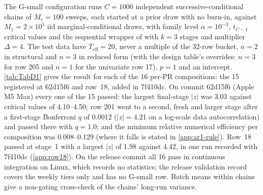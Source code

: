 The G-small configuration runs $C = 1000$ independent successive-conditional chains of $M_c = 100$
sweeps, each started at a prior draw with no burn-in, against $M_1 = 2\times10^5$ iid
marginal-conditional draws, with family level $\alpha = 10^{-3}$, $t_{C-1}$ critical values and the
sequential wrapper of \citet{gandy2021unit} with $k = 3$ stages and multiplier $\Delta = 4$.
The test data have $T_{\mathrm{eff}} = 20$, never a multiple of the 32-row bucket, $n = 2$ in
structural and $n = 3$ in reduced form (with the design table's overrides: $n = 3$ for row 205 and
$n = 1$ for the univariate row 17), $p = 1$ and an intercept.
\cref{tab:TabD1} gives the result for each of the 16 per-PR compositions: the 15 registered at
62d15f6 and row~18, added in 7f410dc.
On commit 62d15f6 (Apple M5 Max) every one of the 15 passed: the largest final-stage $|z|$ was 3.03
against critical values of 4.10--4.50; row 201 went to a second, fresh and larger stage after a
first-stage Bonferroni $q$ of 0.0012 ($|z| = 4.21$ on a log-scale data autocorrelation) and passed
there with $q = 1.0$; and the minimum relative numerical efficiency per composition was 0.008--0.129
(where it falls is stated in \cref{app:ar1-rule}).
Row~18 passed at stage~1 with a largest $|z|$ of 1.98 against 4.42, in one run recorded with
7f410dc (\cref{app:row18}). %
On the release commit all 16 pass in continuous integration on Linux, which records no statistics;
the release validation record covers the weekly tiers only and has no G-small row. %
Batch means within chains \citep{flegal2010batch} give a non-gating cross-check of the chains'
long-run variance. %
